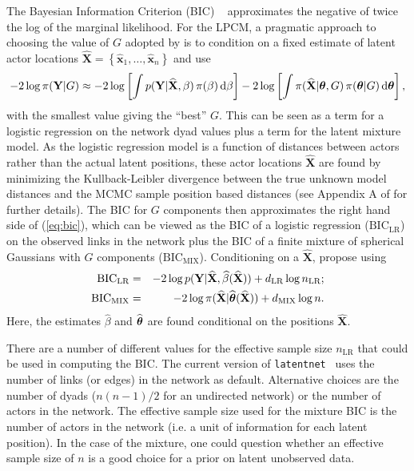 \documentclass[12pt]{article}
\newcommand{\x}{{\mathbf{x}}}
\newcommand{\bX}{{\mathbf{X}}}
\newcommand{\X}{{\mathbf{X}}}
\newcommand{\Y}{{\mathbf{Y}}}
\newcommand{\diff}{\mathrm{d}}
\newcommand{\bftheta}{\hbox{\boldmath$\theta$}}
\begin{document}
The Bayesian Information Criterion (BIC) ~\cite{schwarz1978} approximates the negative of twice the log  of the marginal likelihood. For the LPCM, a pragmatic approach to choosing the value of $G$ adopted by  is to condition on a fixed estimate of latent actor locations $\widehat\X = \left\{ \widehat{\x}_1,\dots,\widehat{\x}_n\right\}$ and use
\begin{equation}
-2 \log\pi(\Y|G) \approx -2 \log \left[\int p(\Y|\widehat{\bX},\beta)\, \pi( \beta ) \, \diff \beta\right] - 2 \log  \left[ \int \pi( \widehat{\bX} | \bftheta,  G )   \, \pi( \bftheta | G ) \,\diff\bftheta \right] ,\label{eq:bic}
\end{equation}
with the smallest value giving the ``best'' $G$. This can be seen as a term for a logistic regression on the network dyad values plus a term for the latent mixture model. As the logistic regression model is a function of distances between actors rather than the actual latent positions, these actor locations $\widehat{\X}$ are found by minimizing the Kullback-Leibler divergence between the true unknown model distances and the MCMC sample position based distances (see Appendix A of  for further details). The BIC for $G$ components then approximates the right hand side of (\ref{eq:bic}), which can be viewed as the BIC of a logistic regression ($\mathrm{BIC}_{\mathrm{LR}}$) on the observed links in the network plus the BIC of a finite mixture of spherical Gaussians with $G$ components ($\mathrm{BIC}_{\mathrm{MIX}}$). Conditioning on a $\widehat{\bX}$,  propose using
\begin{eqnarray*}
\mathrm{BIC}_{\mathrm{LR}} & = & -2 \log p(\Y|\widehat{\bX},\widehat{\beta}(\widehat{\bX}) ) + d_{\mathrm{LR}} \log n_{\mathrm{LR}};  \\
\mathrm{BIC}_{\mathrm{MIX}} & = & -2 \log \pi(\widehat{\bX} |\widehat{\bftheta}(\widehat{\bX})) +  d_{\mathrm{MIX}}  \log n.
\end{eqnarray*}
Here, the estimates $\widehat{\beta}$ and $\widehat{\bftheta}$ are found conditional on the positions $\widehat{\bX}$. 

There are a number of different values for the effective sample size $n_{\mathrm{LR}}$ that could be used in computing the BIC. The current version of \texttt{latentnet}~\cite{Kriv:Hand13} uses the number of links (or edges) in the network as default. Alternative choices are the number of dyads ($n(n-1)/2$ for an undirected network) or the number of actors in the network. The effective sample size used for the mixture BIC is the number of actors in the network (i.e. a unit of information for each latent position). In the case of the mixture, one could question whether an effective sample size of $n$ is a good choice for a prior on latent unobserved data.
\end{document}
